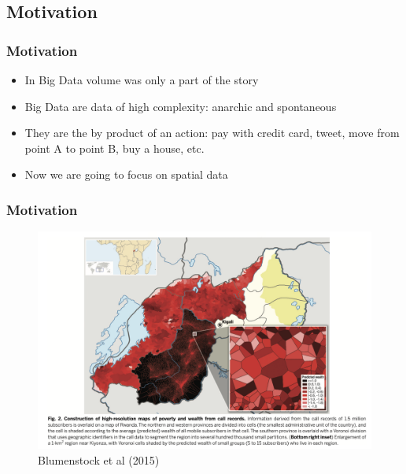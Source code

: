 \documentclass[
  shownotes,
  xcolor={svgnames},
  hyperref={colorlinks,citecolor=DarkBlue,linkcolor=DarkRed,urlcolor=DarkBlue}
   , aspectratio=169]{beamer}
\begin{document}
\subsection{Motivation }


\begin{frame}[fragile]
\frametitle{Motivation}


\begin{itemize}
  \item In Big Data  volume was only a part of the story 
  \bigskip
  \item Big Data are data of high complexity: anarchic and spontaneous
  \bigskip
  \item They are the by product of an action: pay with credit card, tweet, move from point A to point B, buy a house, etc.
	\bigskip
  \item Now we are going to focus on spatial data
\end{itemize}

\end{frame}


\begin{frame}[fragile]
\frametitle{Motivation}

\begin{figure}[H] \centering
  \centering
  \includegraphics[scale=0.3]{figures/blumenstock_fig2.png}
  \\
  \tiny Blumenstock et al (2015)
\end{figure}

\end{frame}
\end{document}

